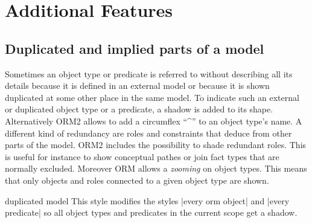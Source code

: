 \documentclass[a4paper,10pt]{article}
\begin{document}
\section{Additional Features}
\label{sec:additionalfeatures}

\subsection{Duplicated and implied parts of a model}
\label{sec:duplicatedandimplied}
Sometimes an object type or predicate is referred to without describing all its details because it is defined in an external model or because it is shown duplicated at some other place in the same model. To indicate such an external or duplicated object type or a predicate, a shadow is added to its shape. Alternatively ORM2 allows to add a circumflex ``\^{}'' to an object type's name. A different kind of redundancy are roles and constraints that deduce from other parts of the model. ORM2 includes the possibility to shade redundant roles. This is useful for instance to show conceptual pathes or join fact types that are normally excluded. Moreover ORM allows a \emph{zooming} on object types. This means that only objects and roles connected to a given object type are shown.

\begin{stylekey}{duplicated model}
This style modifies the styles |every orm object| and |every predicate| so all object types and predicates in the current scope get a shadow.
\begin{codeexample}[]
\end{codeexample}
\end{stylekey} %
\end{document}
